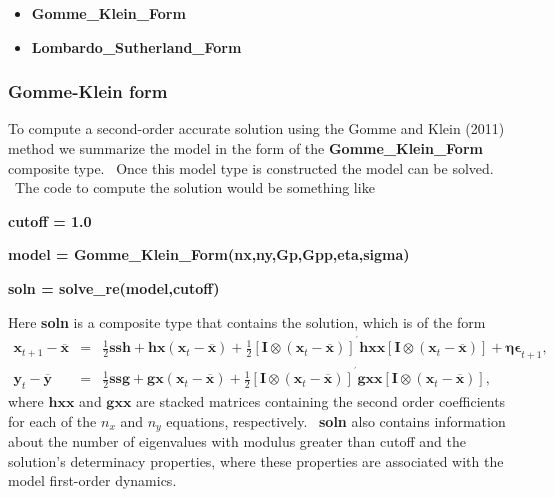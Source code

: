 \documentclass[thmsa,notitlepage,11pt]{article}
\begin{document}
\begin{itemize}
\item \textbf{Gomme\_Klein\_Form}

\item \textbf{Lombardo\_Sutherland\_Form}
\end{itemize}

\subsubsection{Gomme-Klein form}

To compute a second-order accurate solution using the Gomme and Klein (2011)
method we summarize the model in the form of the \textbf{Gomme\_Klein\_Form}
composite type. \ Once this model type is constructed the model can be
solved. \ The code to compute the solution would be something like

\bigskip

\textbf{cutoff = 1.0}

\textbf{model = Gomme\_Klein\_Form(nx,ny,Gp,Gpp,eta,sigma)}

\textbf{soln = solve\_re(model,cutoff)}

\bigskip

Here \textbf{soln} is a composite type that contains the solution, which is
of the form%
\begin{eqnarray*}
\mathbf{x}_{t+1}-\overline{\mathbf{x}} &=&\frac{1}{2}\mathbf{ssh}+\mathbf{hx}%
\left( \mathbf{x}_{t}-\overline{\mathbf{x}}\right) +\frac{1}{2}\left[ 
\mathbf{I}\otimes \left( \mathbf{x}_{t}-\overline{\mathbf{x}}\right) \right]
^{^{\prime }}\mathbf{hxx}\left[ \mathbf{I}\otimes \left( \mathbf{x}_{t}-%
\overline{\mathbf{x}}\right) \right] +\mathbf{\eta \epsilon }_{t+1}, \\
\mathbf{y}_{t}-\overline{\mathbf{y}} &=&\frac{1}{2}\mathbf{ssg}+\mathbf{gx}%
\left( \mathbf{x}_{t}-\overline{\mathbf{x}}\right) +\frac{1}{2}\left[ 
\mathbf{I}\otimes \left( \mathbf{x}_{t}-\overline{\mathbf{x}}\right) \right]
^{^{\prime }}\mathbf{gxx}\left[ \mathbf{I}\otimes \left( \mathbf{x}_{t}-%
\overline{\mathbf{x}}\right) \right] ,
\end{eqnarray*}%
where $\mathbf{hxx}$ and $\mathbf{gxx}$ are stacked matrices containing the
second order coefficients for each of the $n_{x}$ and $n_{y}$ equations,
respectively. \ \textbf{soln} also contains information about the number of
eigenvalues with modulus greater than cutoff and the solution's determinacy
properties, where these properties are associated with the model first-order
dynamics.
\end{document}
